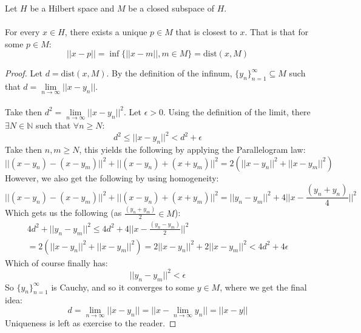 \documentclass[12pt]{article}
\newcommand{\bignorm}{\Big | \Big |}
\newenvironment{theorem}[2][Theorem]{\begin{trivlist}
\item[\hskip \labelsep {\bfseries #1}\hskip \labelsep {\bfseries #2.}]}{\end{trivlist}}
\begin{document}
\begin{theorem}{(Unique Closest Point)}
    Let $H$ be a Hilbert space and $M$ be a closed subspace of $H$. \\ \\
    For every $x \in H$, there exists a unique $p \in M$ that is closest to $x$. That is that for some $p \in M$:
    \begin{equation}
        ||x - p|| = \inf \{||x - m|| , m \in M\} = \text{dist}(x, M)
    \end{equation}
    \begin{proof}
        Let $d = \text{dist}(x, M)$. By the definition of the infinum, $\{y_n\}_{n = 1}^\infty \subseteq M$ such that $d = \underset{n \rightarrow \infty}{\lim} ||x - y_n||$. \\ \\
        Take then $d^2 = \underset{n \rightarrow \infty}{\lim} ||x - y_n||^2$. Let $\epsilon > 0$. Using the definition of the limit, there $\exists N \in \mathbb{N}$ such that $\forall n \geq N$:
        $$d^2 \leq ||x - y_n||^2 < d^2 + \epsilon$$
        Take then $n, m \geq N$, this yields the following by applying the Parallelogram law:
        \begin{equation}
                ||(x - y_n) - (x - y_m)||^2 + ||(x - y_n) + (x + y_m)||^2 = 2(||x - y_n||^2 + ||x - y_m||^2)
        \end{equation}
        However, we also get the following by using homogeneity:
        \begin{equation}
            ||(x - y_n) - (x - y_m)||^2 + ||(x - y_n) + (x + y_m)||^2 = ||y_n - y_m||^2 + 4||x - \frac{(y_n + y_n)}{4}||^2
        \end{equation}
        Which gets us the following (as $\frac{(y_n + y_m)}{2} \in M$):
        \begin{equation}
            \begin{aligned}
                4d^2 + ||y_n - y_m||^2 \leq 4d^2 + 4 \bignorm x - \frac{(y_n - y_m)}{2} \bignorm^2 \\
                = 2(||x - y_n||^2 + ||x - y_m||^2) = 2||x - y_n||^2 + 2||x - y_m||^2 < 4d^2 + 4\epsilon 
            \end{aligned}
        \end{equation}
        Which of course finally has:
        \begin{equation}
            ||y_n - y_m||^2 < \epsilon
        \end{equation}
        So $\{y_n\}_{n = 1}^\infty$ is Cauchy, and so it converges to some $y \in M$, where we get the final idea:
        \begin{equation}
            d = \underset{n \rightarrow \infty}{\lim} ||x - y_n|| = ||x - \underset{n \rightarrow \infty}{\lim} y_n || = ||x - y||
        \end{equation}
        Uniqueness is left as exercise to the reader.
    \end{proof}
\end{theorem}
\end{document}
